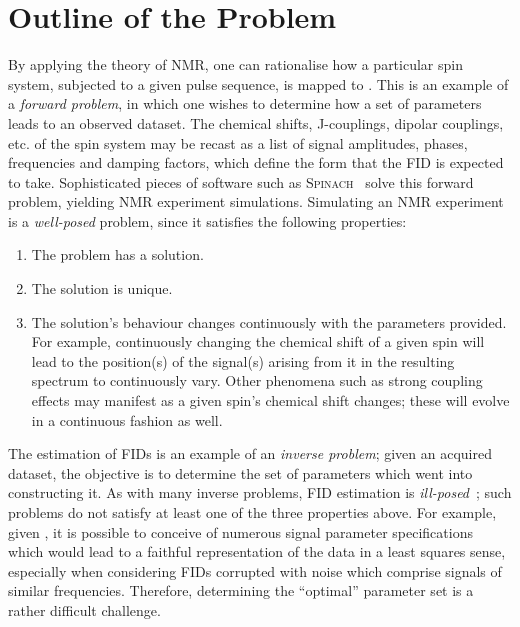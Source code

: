 \section{Outline of the Problem}
\label{sec:theory-outline}
By applying the theory of \ac{NMR}, one can
rationalise how a particular spin system, subjected to a given pulse sequence,
is mapped to . This is an example of a \emph{forward problem},
in which one wishes to determine how a set of parameters leads to an
observed dataset.
The chemical shifts, J-couplings, dipolar couplings, etc. of the spin system
may be recast as a list of signal amplitudes, phases, frequencies and
damping factors, which define the form that the \ac{FID} is expected to take.
Sophisticated pieces of software such as \textsc{Spinach}~\cite{Hogben2011}
solve this forward problem, yielding \ac{NMR} experiment simulations.
Simulating an \ac{NMR} experiment is a \emph{well-posed} problem, since it
satisfies the following properties:
\begin{enumerate}
    \item The problem has a solution.
    \item The solution is unique.
    \item The solution's behaviour changes continuously with the parameters
        provided. For example, continuously changing the chemical shift of a
        given spin will lead to the position(s) of the signal(s) arising from
        it in the resulting spectrum to continuously vary. Other phenomena such
        as strong coupling effects may manifest as a given spin's chemical
        shift changes; these will evolve in a continuous fashion as well.
\end{enumerate}
The estimation of \acp{FID} is an example of an \emph{inverse problem};
given an acquired dataset, the objective is to determine the set of parameters
which went into constructing it.
As with many inverse problems, \ac{FID} estimation is
\emph{ill-posed}~\cite{Kabanikhin2008}; such problems do not satisfy at least
one of the three properties above. For example, given , it is possible
to conceive of numerous signal parameter specifications which would lead to a
faithful representation of the data in a least squares sense, especially when
considering \acp{FID} corrupted with noise which comprise signals of similar
frequencies. Therefore, determining the ``optimal'' parameter set is a rather
difficult challenge.

